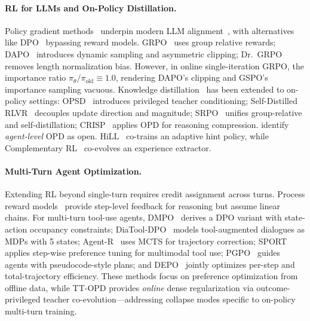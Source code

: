 \documentclass{article}
\begin{document}
\paragraph{RL for LLMs and On-Policy Distillation.}
Policy gradient methods~\citep{schulman2017ppo} underpin modern LLM alignment~\citep{ouyang2022instructgpt}, with alternatives like DPO~\citep{rafailov2023dpo} bypassing reward models. GRPO~\citep{shao2024deepseekmath} uses group relative rewards; DAPO~\citep{dapo2025} introduces dynamic sampling and asymmetric clipping; Dr.~GRPO~\citep{liu2025drgrpo} removes length normalization bias. However, in online single-iteration GRPO, the importance ratio $\pi_\theta/\pi_\text{old} \equiv 1.0$, rendering DAPO's clipping and GSPO's~\citep{gspo2025} importance sampling vacuous. Knowledge distillation~\citep{hinton2015distillation} has been extended to on-policy settings: OPSD~\citep{zhao26opsd} introduces privileged teacher conditioning; Self-Distilled RLVR~\citep{yang26rlsd} decouples update direction and magnitude; SRPO~\citep{li26srpo} unifies group-relative and self-distillation; CRISP~\citep{sang26crisp} applies OPD for reasoning compression. \citet{song26opdsurvey} identify \emph{agent-level} OPD as open. HiLL~\citep{xia26hill} co-trains an adaptive hint policy, while Complementary RL~\citep{muhtar26complementaryrl} co-evolves an experience extractor.

\paragraph{Multi-Turn Agent Optimization.}
Extending RL beyond single-turn requires credit assignment across turns. Process reward models~\citep{lightman2024lets, uesato2022solving} provide step-level feedback for reasoning but assume linear chains. For multi-turn tool-use agents, DMPO~\citep{shi2024dmpo} derives a DPO variant with state-action occupancy constraints; DiaTool-DPO~\citep{jung2025diatooldpo} models tool-augmented dialogues as MDPs with 5 states; Agent-R~\citep{yuan2025agentr} uses MCTS for trajectory correction; SPORT~\citep{li2025sport} applies step-wise preference tuning for multimodal tool use; PGPO~\citep{cao2025pgpo} guides agents with pseudocode-style plans; and DEPO~\citep{chen2025depo} jointly optimizes per-step and total-trajectory efficiency. These methods focus on preference optimization from offline data, while TT-OPD provides \emph{online} dense regularization via outcome-privileged teacher co-evolution---addressing collapse modes specific to on-policy multi-turn training.
\end{document}
